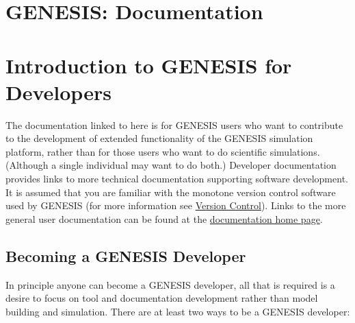 \documentclass[12pt]{article}
\begin{document}
\section*{GENESIS: Documentation}

\section*{Introduction to GENESIS for Developers}

The documentation linked to here is for GENESIS users who want to contribute to the development of extended functionality of the GENESIS simulation platform, rather than for those users who want to do scientific simulations. (Although a single individual may want to do both.) Developer documentation provides links to more technical documentation supporting software development. It is assumed that you are familiar with the monotone version control software used by GENESIS (for more information see \href{../document-versionctrl/document-versionctrl.tex}{Version Control}). Links to the more general user documentation can be found at the \href{../document-homepage/document-homepage.tex}{documentation home page}. 

\subsection*{Becoming a GENESIS Developer}

In principle anyone can become a GENESIS developer, all that is required is a desire to focus on tool and documentation development rather than model building and simulation. There are at least two ways to be a GENESIS  developer:
\end{document}
